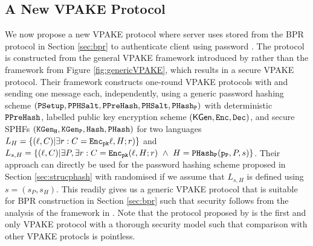 \subsection{A New VPAKE Protocol} \label{sec:vpake}
We now propose a new \ac{VPAKE} protocol where server \Server uses \ver stored from the \ac{BPR} protocol in Section \ref{sec:bpr} to authenticate client \Client using password \pwd. 
The protocol is constructed from the general \ac{VPAKE} framework introduced by \citet{BenhamoudaP13} rather than the framework from Figure \ref{fig:genericVPAKE}, which results in a secure \ac{VPAKE} protocol. 
Their framework constructs one-round \ac{VPAKE} protocols with \Client and \Server sending one message each, independently, using a generic password hashing scheme $(\mathtt{PSetup}, \mathtt{PPHSalt}, \mathtt{PPreHash},\mathtt{PHSalt}, \mathtt{PHash_P})$ with deterministic $\mathtt{PPreHash}$, labelled public key encryption scheme $(\mathsf{KGen}, \mathtt{Enc}, \mathtt{Dec})$, and secure \acp{SPHF} $(\mathtt{KGen_H}, \mathtt{KGen_P}, \mathtt{Hash}, \mathtt{PHash})$ for two languages $L_H = \{(\ell, C) | \exists r : C = \mathtt{Enc}_\mathtt{pk}\ell, H; r)\}$ and $L_{s,H}  = \{(\ell, C) | \exists P, \exists r : C = \mathtt{Enc}_\mathtt{pk}(\ell, H; r)\ \wedge\ H = \mathtt{PHash_P}(\mathtt{p_P},\allowbreak P, s)\}$. 
Their approach can directly be used for the password hashing scheme proposed in Section \ref{sec:strucphash} with randomised \PPreHash if we assume that $L_{s,H}$ is defined using $s=(s_P,s_H)$. 
This readily gives us a generic \ac{VPAKE} protocol that is suitable for \ac{BPR} construction in Section \ref{sec:bpr} such that security follows from the analysis of the framework in \cite{BenhamoudaP13}.
Note that the protocol proposed by \cite{BenhamoudaP13} is the first and only \ac{VPAKE} protocol with a thorough security model such that comparison with other \ac{VPAKE} protocls is pointless.

